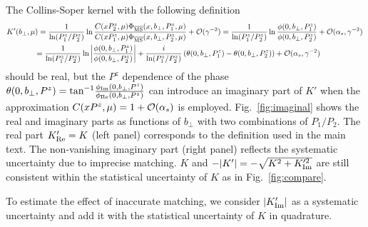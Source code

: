 The Collins-Soper kernel with the following definition
\begin{align}
&K'(b_\perp,\mu)=\frac{1}{\ln(P_1^z/P_2^z)}\ln\frac{C(xP_2^z,\mu) \Phi_{\overline{\rm MS}}(x,b_\perp,P_1^z,\mu)}{C(xP_1^z,\mu) \Phi_{\overline{\rm MS}}(x,b_\perp,P_2^z,\mu)}+{\cal O}(\gamma^{-2})=\frac{1}{\ln(P_1^z/P_2^z)}\ln\frac{\phi(0,b_\perp,P_1^z)}{\phi(0,b_\perp,P_2^z)}+{\cal O}(\alpha_s, \gamma^{-2})\, \nonumber\\
&\quad\quad\quad\ \ =\frac{1}{\ln(P_1^z/P_2^z)}\ln\left|\frac{\phi(0,b_\perp,P_1^z)}{\phi(0,b_\perp,P_2^z)}\right|+\frac{i}{\ln(P_1^z/P_2^z)}\left(\theta(0,b_\perp,P_1^z)-\theta(0,b_\perp,P_2^z)\right)+{\cal O}(\alpha_s, \gamma^{-2})\, \label{eq:CSK_full}
\end{align}
should be real, but the $P^z$ dependence of the phase $\theta(0,b_\perp,P^z)=\textrm{tan}^{-1}\frac{\phi_{\rm Im}(0,b_\perp,P^z)}{\phi_{\rm Re}(0,b_\perp,P^z)}$ can introduce an {imaginary} part of $K'$ when the approximation $C(xP^z,\mu)=1+{\cal O}(\alpha_s)$ is employed. Fig.~\ref{fig:imaginal} shows the real and imaginary parts   as   functions of $b_\perp$ with two combinations of $P_1/P_2$. The real part $K'_{\rm Re}=K$ (left panel)  corresponds to the definition used in  the main text.   The non-vanishing  imaginary part (right panel)  reflects the systematic    uncertainty due to imprecise matching.  $K$ and $-|K'|=-\sqrt{K^2+K'^2_{\rm Im}}$ are  still consistent within the statistical uncertainty of $K$ as in Fig.~\ref{fig:compare}.

To estimate the effect of inaccurate matching, we consider $|K'_{\rm Im}|$ as a systematic uncertainty and {add} it with the statistical uncertainty of $K$ in quadrature.

